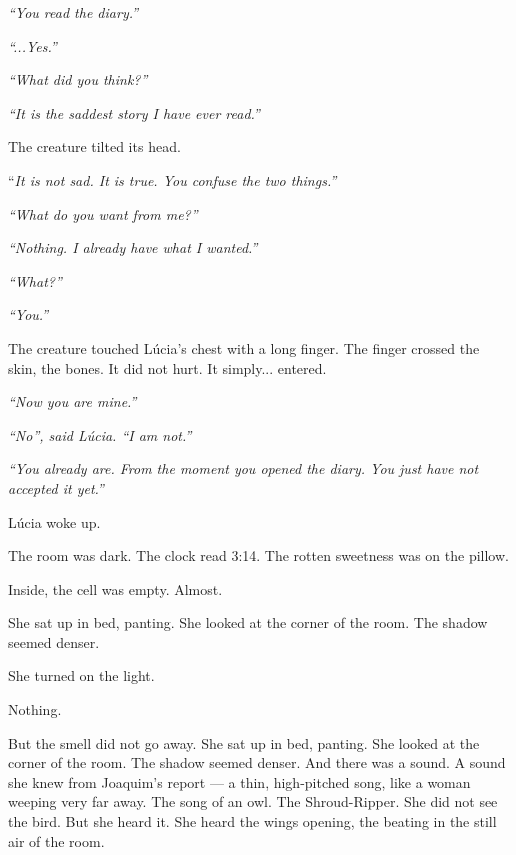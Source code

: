 \noindent \textit{\textquotedblleft{}You read the diary.\textquotedblright{}}

\noindent \textit{\textquotedblleft{}...Yes.\textquotedblright{}}

\noindent \textit{\textquotedblleft{}What did you think?\textquotedblright{}}

\noindent \textit{\textquotedblleft{}It is the saddest story I have ever read.\textquotedblright{}}

\noindent The creature tilted its head.

\noindent \textquotedblleft{\textit{It is not sad. It is true. You confuse the two things.\textquotedblright{}}}

\noindent \textit{\textquotedblleft{}What do you want from me?\textquotedblright{}}

\noindent \textit{\textquotedblleft{}Nothing. I already have what I wanted.\textquotedblright{}}

\noindent \textit{\textquotedblleft{}What?\textquotedblright{}}

\noindent \textit{\textquotedblleft{}You.\textquotedblright{}}

\noindent The creature touched Lúcia's chest with a long finger. The finger crossed the skin, the bones. It did not hurt. It simply... entered.

\noindent \textit{\textquotedblleft{}Now you are mine.\textquotedblright{}}

\noindent \textit{\textquotedblleft{}No\textquotedblright{}\textit{, said Lúcia. }\textquotedblleft{}I am not.\textquotedblright{}}

\noindent \textit{\textquotedblleft{}You already are. From the moment you opened the diary. You just have not accepted it yet.\textquotedblright{}}

\noindent Lúcia woke up.

\noindent The room was dark. The clock read 3:14.
\noindent The rotten sweetness was on the pillow.

\noindent Inside, the cell was empty. Almost.

\noindent She sat up in bed, panting. She looked at the corner of the room. The shadow seemed denser.

\noindent She turned on the light.

\noindent Nothing.

\noindent But the smell did not go away.
\noindent She sat up in bed, panting. She looked at the corner of the room. The shadow seemed denser. And there was a sound. A sound she knew from Joaquim's report --- a thin, high-pitched song, like a woman weeping very far away. The song of an owl. The Shroud-Ripper. She did not see the bird. But she heard it. She heard the wings opening, the beating in the still air of the room.

